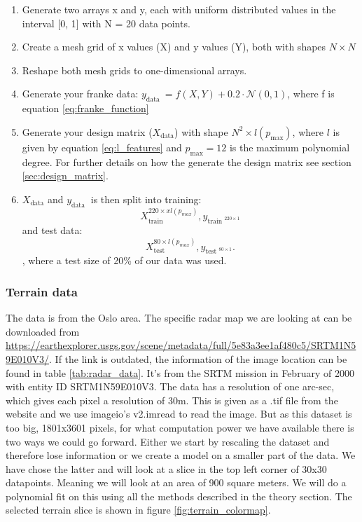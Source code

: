 \begin{mdframed}[backgroundcolor=black!10]
\begin{enumerate}
\item Generate two arrays x and y, each with uniform distributed values in the
interval [0, 1] with N = 20 data points. 
\item Create a mesh grid of x values (X) and y values (Y), both with shapes $N
\times N$ 
\item Reshape both mesh grids to one-dimensional arrays.  
\item Generate your franke data: $y_{\text{data }} = f(X, Y) + 0.2 \cdot  
\mathcal{N}(0,1)$, where f is equation \ref{eq:franke_function}  
\item Generate your design matrix ($X_{\text{data}} $) with shape $N^2 \times l(p_{\text{max}} )$,
where $l$ is given by equation \ref{eq:l_features} and $p_{\text{max}} = 12 $
is the maximum polynomial degree. For further details on how the generate the
design matrix see section \ref{sec:design_matrix}.  
\item $X_{\text{data}}$ and $y_{\text{data }} $ is then split into training: 
\begin{equation*}
    X_{\text{train }}^{220 \times x l(p_{max} )}, y_{\text{train }^{220\times 1}} 
\end{equation*}
and test data: 
\begin{equation*}
    X_{\text{test }}^{80\times l(p_{max} )},  y_{\text{test }^{80\times1}}.
\end{equation*},
where a test size of 20\% of our data was used. 
\end{enumerate}

\end{mdframed}


\subsubsection{Terrain data}
The data is from the Oslo area. The specific radar map we are looking at can be
downloaded from
\href{https://earthexplorer.usgs.gov/scene/metadata/full/5e83a3ee1af480c5/SRTM1N59E010V3/}{https://earthexplorer.usgs.gov/scene/metadata/full/5e83a3ee1af480c5/SRTM1N59E010V3/}.
If the link is outdated, the information of the image location can be found in
table \ref{tab:radar_data}. It's from the SRTM mission in February of 2000 with
entity ID SRTM1N59E010V3. The data has a resolution of one arc-sec, which gives
each pixel a resolution of 30m. This is given as a .tif file from the website
and we use imageio's v2.imread to read the image. But as this dataset is too
big, 1801x3601 pixels, for what computation power we have available there is
two ways we could go forward. Either we start by rescaling the dataset and
therefore lose information or we create a model on a smaller part of the data.
We have chose the latter and will look at a slice in the top left corner of
30x30 datapoints. Meaning we will look at an area of 900 square meters. We will
do a polynomial fit on this using all the methods described in the theory
section. The selected terrain slice is shown in figure \ref{fig:terrain_colormap}. 


